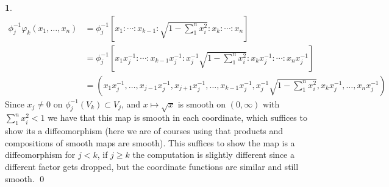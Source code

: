 \documentclass[10.5pt]{article}
\theoremstyle{definition}
\newtheorem{pb}{}
\begin{document}
\begin{pb}
        \begin{align*}
            \phi_j^{-1}\varphi_k(x_1,\hdots,x_n) &= \phi_j^{-1}\left[x_1:\cdots:x_{k-1}:\sqrt{1-\sum_1^n x_i^2}:x_k:\cdots:x_n\right] \\
            &= \phi_j^{-1}\left[x_1x_j^{-1}:\cdots:x_{k-1}x_j^{-1}:x_j^{-1}\sqrt{1-\sum_1^n x_i^2}:x_kx_j^{-1}:\cdots:x_nx_j^{-1}\right] \\
            &= \left(x_1x_j^{-1},\hdots,x_{j-1}x_j^{-1},x_{j+1}x_j^{-1},\hdots,x_{k-1}x_j^{-1},x_j^{-1}\sqrt{1 - \sum_1^n x_i^2},x_kx_j^{-1},\hdots,x_nx_j^{-1}\right)
        \end{align*}
        Since \(x_j \neq 0\) on \(\phi_j^{-1}(V_k) \subset V_j\), and \(x \mapsto \sqrt{x}\) is smooth on \((0,\infty)\) with \(\sum_1^n x_i^2 < 1\) we have that this map is smooth in each coordinate, which suffices to show its a diffeomorphism (here we are of courses using that products and compositions of smooth maps are smooth). This suffices to show the map is a diffeomorphism for \(j<k\), if \(j \geq k\) the computation is slightly different since a different factor gets dropped, but the coordinate functions are similar and still smooth. \qed
    \end{pb}
\end{document}
